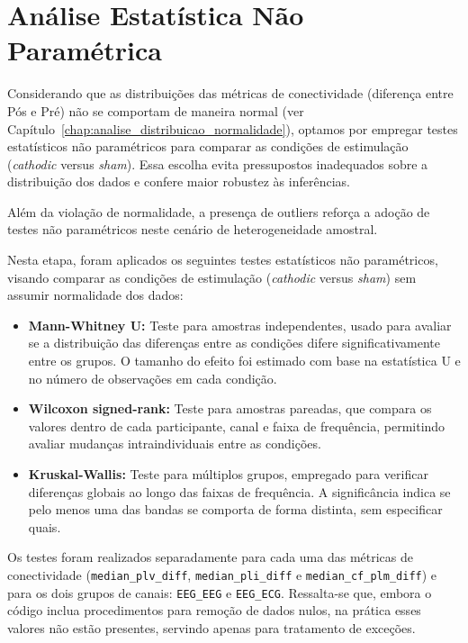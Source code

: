 \chapter{Análise Estatística Não Paramétrica}
\label{chap:analise_estatistica_np}

Considerando que as distribuições das métricas de conectividade (diferença entre Pós e Pré) não se comportam de maneira normal (ver Capítulo~\ref{chap:analise_distribuicao_normalidade}), optamos por empregar testes estatísticos não paramétricos para comparar as condições de estimulação (\texorpdfstring{\textit{cathodic} versus \textit{sham}}{cathodic versus sham}). Essa escolha evita pressupostos inadequados sobre a distribuição dos dados e confere maior robustez às inferências.

Além da violação de normalidade, a presença de outliers reforça a adoção de testes não paramétricos neste cenário de heterogeneidade amostral.

Nesta etapa, foram aplicados os seguintes testes estatísticos não paramétricos, visando comparar as condições de estimulação (\textit{cathodic} versus \textit{sham}) sem assumir normalidade dos dados:

\begin{itemize}
    \item \textbf{Mann-Whitney U:} Teste para amostras independentes, usado para avaliar se a distribuição das diferenças entre as condições difere significativamente entre os grupos. O tamanho do efeito foi estimado com base na estatística U e no número de observações em cada condição.
    
    \item \textbf{Wilcoxon signed-rank:} Teste para amostras pareadas, que compara os valores dentro de cada participante, canal e faixa de frequência, permitindo avaliar mudanças intraindividuais entre as condições.

    \item \textbf{Kruskal-Wallis:} Teste para múltiplos grupos, empregado para verificar diferenças globais ao longo das faixas de frequência. A significância indica se pelo menos uma das bandas se comporta de forma distinta, sem especificar quais.
\end{itemize}

Os testes foram realizados separadamente para cada uma das métricas de conectividade (\texttt{median\_plv\_diff}, \texttt{median\_pli\_diff} e \texttt{median\_cf\_plm\_diff}) e para os dois grupos de canais: \texttt{EEG\_EEG} e \texttt{EEG\_ECG}. Ressalta-se que, embora o código inclua procedimentos para remoção de dados nulos, na prática esses valores não estão presentes, servindo apenas para tratamento de exceções.

